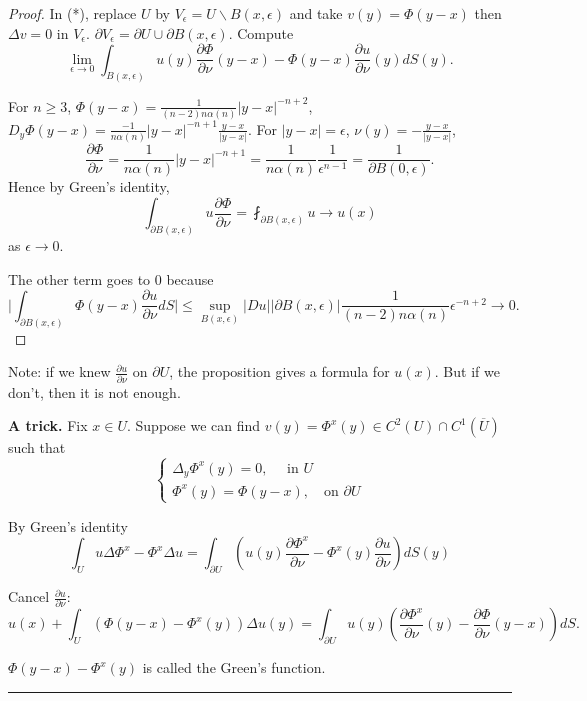 \documentclass[11pt]{amsart}%
\begin{document}
\begin{proof}
    In (*), replace $U$ by $V_\epsilon=U\backslash B(x,\epsilon)$ and take $v(y) =\Phi(y-x)$ then $\Delta v=0$ in $V_\epsilon$. $\partial V_\epsilon =\partial U\cup \partial B(x,\epsilon)$. Compute
    $$\lim_{\epsilon\to 0}\int_{B(x,\epsilon)} u(y)\frac{\partial \Phi}{\partial \nu}(y-x) -\Phi(y-x)\frac{\partial u}{\partial \nu}(y) dS(y).$$
    
    For $n\ge 3$, $\Phi(y-x) =\frac{1}{(n-2)n\alpha(n)}\vert y-x\vert ^{-n+2}$, $D_y\Phi(y-x)= \frac{-1}{n\alpha(n)}\vert y-x\vert^{-n+1}\frac{y-x}{\vert y-x\vert}$. For $\vert y-x\vert =\epsilon$, $\nu(y)= -\frac{y-x}{\vert y-x\vert}$,
    $$\frac{\partial \Phi}{\partial \nu}=\frac{1}{n\alpha(n)}\vert y-x\vert^{-n+1} =\frac{1}{n\alpha(n)}\frac{1}{\epsilon^{n-1}} =\frac{1}{\partial B(0,\epsilon)}.$$
    Hence by Green's identity,
    $$\int_{\partial B(x,\epsilon)} u\frac{\partial \Phi}{\partial \nu} =\fint_{\partial B(x,\epsilon)}u \to u(x)$$ as $\epsilon\to 0$.
    
    The other term goes to 0 because
    $$\vert \int_{\partial B(x,\epsilon)} \Phi(y-x)\frac{\partial u}{\partial \nu}dS\vert \le \sup_{B(x,\epsilon)}|Du||\partial B(x,\epsilon)|\frac{1}{(n-2)n\alpha(n)}\epsilon^{-n+2} \to 0.$$
\end{proof}
Note: if we knew $\frac{\partial u}{\partial \nu}$ on $\partial U$, the proposition gives a formula for $u(x)$. But if we don't, then it is not enough.

{\bf A trick.} Fix $x\in U$. Suppose we can find $v(y)=\Phi^x(y)\in C^2(U)\cap C^1(\overline{U})$ such that
$$\begin{cases}
    \Delta_y\Phi^x(y) =0, \quad \text{ in $U$}\\
    \Phi^x(y) =\Phi(y-x), \quad \text{on $\partial U$}
\end{cases}$$

By Green's identity
$$\int_U u\Delta\Phi^x -\Phi^x\Delta u =\int_{\partial U} (u(y)\frac{\partial \Phi^x}{\partial \nu} - \Phi^x(y)\frac{\partial u}{\partial \nu})dS(y)$$

Cancel $\frac{\partial u}{\partial \nu}$:
$$u(x) + \int_U (\Phi(y-x) -\Phi^x(y))\Delta u(y) =\int_{\partial U} u(y)(\frac{\partial \Phi^x}{\partial \nu}(y) -\frac{\partial \Phi}{\partial \nu}(y-x))dS.$$

$\Phi(y-x) -\Phi^x(y)$ is called the Green's function.

\begin{center}\rule{0.5\linewidth}{\linethickness}\end{center}
\end{document}
